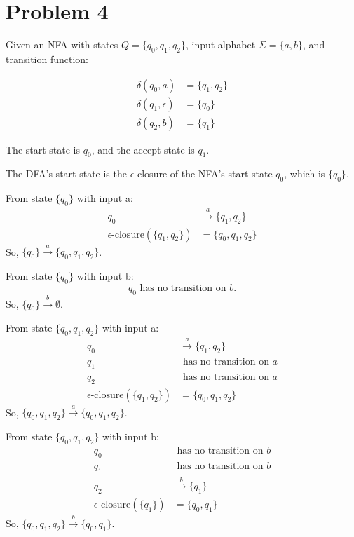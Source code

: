 \documentclass[12 pt]{article}
\begin{document}
\vspace{20pt}

\section*{Problem 4}

Given an NFA with states \( Q = \{q_0, q_1, q_2\} \), input alphabet \( \Sigma = \{a, b\} \), and transition function:

\[
\begin{aligned}
\delta(q_0, a) &= \{q_1, q_2\} \\
\delta(q_1, \epsilon) &= \{q_0\} \\
\delta(q_2, b) &= \{q_1\}
\end{aligned}
\]

The start state is \( q_0 \), and the accept state is \( q_1 \).


   The DFA's start state is the \(\epsilon\)-closure of the NFA's start state \( q_0 \), which is \( \{q_0\} \).


   From state \( \{q_0\} \) with input a:
       \[
       \begin{aligned}
       q_0 &\xrightarrow{a} \{q_1, q_2\} \\
       \epsilon\text{-closure}(\{q_1, q_2\}) &= \{q_0, q_1, q_2\}
       \end{aligned}
       \]
       So, \( \{q_0\} \xrightarrow{a} \{q_0, q_1, q_2\} \).

    From state \( \{q_0\} \) with input b:
       \[
       q_0 \text{ has no transition on } b.
       \]
       So, \( \{q_0\} \xrightarrow{b} \emptyset \).

   From state \( \{q_0, q_1, q_2\} \) with input a:
       \[
       \begin{aligned}
       q_0 &\xrightarrow{a} \{q_1, q_2\} \\
       q_1 &\text{ has no transition on } a \\
       q_2 &\text{ has no transition on } a \\
       \epsilon\text{-closure}(\{q_1, q_2\}) &= \{q_0, q_1, q_2\}
       \end{aligned}
       \]
       So, \( \{q_0, q_1, q_2\} \xrightarrow{a} \{q_0, q_1, q_2\} \).

    From state \( \{q_0, q_1, q_2\} \) with input b:
       \[
       \begin{aligned}
       q_0 &\text{ has no transition on } b \\
       q_1 &\text{ has no transition on } b \\
       q_2 &\xrightarrow{b} \{q_1\} \\
       \epsilon\text{-closure}(\{q_1\}) &= \{q_0, q_1\}
       \end{aligned}
       \]
       So, \( \{q_0, q_1, q_2\} \xrightarrow{b} \{q_0, q_1\} \).
\end{document}
